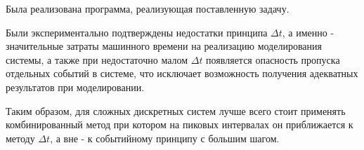 \documentclass[a4paper,12pt]{article}
\begin{document}
	Была реализована программа, реализующая поставленную задачу.
	
	Были экспериментально подтверждены недостатки принципа $\Delta t$, а именно - значительные затраты машинного времени на реализацию моделирования системы, а также при недостаточно малом $\Delta t$ появляется опасность пропуска отдельных событий в системе, что исключает возможность получения адекватных результатов при моделировании.
	
	Таким образом, для сложных дискретных систем лучше всего стоит применять комбинированный метод при котором на пиковых интервалах он приближается к методу $\Delta t$, а вне - к событийному принципу с большим шагом.
	
\end{document}
